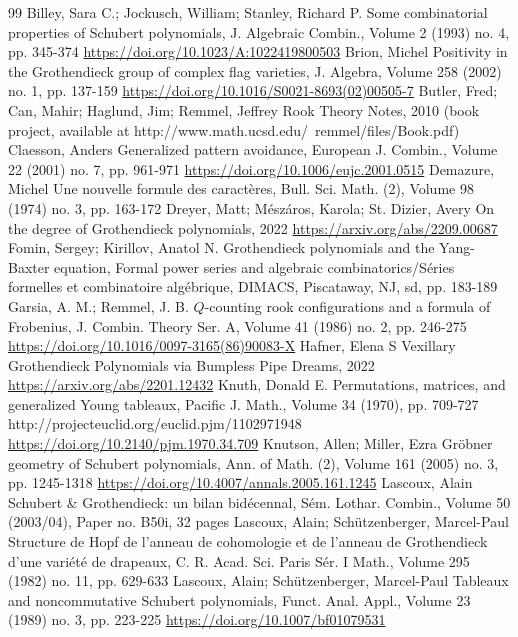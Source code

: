 \begin{thebibliography}{99}
 Billey, Sara C.; Jockusch, William; Stanley, Richard P. Some combinatorial properties of Schubert polynomials, J. Algebraic Combin., Volume 2 (1993) no. 4, pp. 345-374 \url{https://doi.org/10.1023/A:1022419800503}
 Brion, Michel Positivity in the Grothendieck group of complex flag varieties, J. Algebra, Volume 258 (2002) no. 1, pp. 137-159 \url{https://doi.org/10.1016/S0021-8693(02)00505-7}
 Butler, Fred; Can, Mahir; Haglund, Jim; Remmel, Jeffrey Rook Theory Notes, 2010 (book project, available at http://www.math.ucsd.edu/~remmel/files/Book.pdf)
 Claesson, Anders Generalized pattern avoidance, European J. Combin., Volume 22 (2001) no. 7, pp. 961-971 \url{https://doi.org/10.1006/eujc.2001.0515}
 Demazure, Michel Une nouvelle formule des caractères, Bull. Sci. Math. (2), Volume 98 (1974) no. 3, pp. 163-172
 Dreyer, Matt; Mészáros, Karola; St. Dizier, Avery On the degree of Grothendieck polynomials, 2022 \url{https://arxiv.org/abs/2209.00687}
 Fomin, Sergey; Kirillov, Anatol N. Grothendieck polynomials and the Yang-Baxter equation, Formal power series and algebraic combinatorics/Séries formelles et combinatoire algébrique, DIMACS, Piscataway, NJ, sd, pp. 183-189
 Garsia, A. M.; Remmel, J. B. $Q$-counting rook configurations and a formula of Frobenius, J. Combin. Theory Ser. A, Volume 41 (1986) no. 2, pp. 246-275 \url{https://doi.org/10.1016/0097-3165(86)90083-X}
 Hafner, Elena S Vexillary Grothendieck Polynomials via Bumpless Pipe Dreams, 2022 \url{https://arxiv.org/abs/2201.12432}
 Knuth, Donald E. Permutations, matrices, and generalized Young tableaux, Pacific J. Math., Volume 34 (1970), pp. 709-727 http://projecteuclid.org/euclid.pjm/1102971948 \url{https://doi.org/10.2140/pjm.1970.34.709}
 Knutson, Allen; Miller, Ezra Gröbner geometry of Schubert polynomials, Ann. of Math. (2), Volume 161 (2005) no. 3, pp. 1245-1318 \url{https://doi.org/10.4007/annals.2005.161.1245}
 Lascoux, Alain Schubert \& Grothendieck: un bilan bidécennal, Sém. Lothar. Combin., Volume 50 (2003/04), Paper no. B50i, 32 pages
 Lascoux, Alain; Schützenberger, Marcel-Paul Structure de Hopf de l’anneau de cohomologie et de l’anneau de Grothendieck d’une variété de drapeaux, C. R. Acad. Sci. Paris Sér. I Math., Volume 295 (1982) no. 11, pp. 629-633
 Lascoux, Alain; Schützenberger, Marcel-Paul Tableaux and noncommutative Schubert polynomials, Funct. Anal. Appl., Volume 23 (1989) no. 3, pp. 223-225 \url{https://doi.org/10.1007/bf01079531}

\end{thebibliography}
